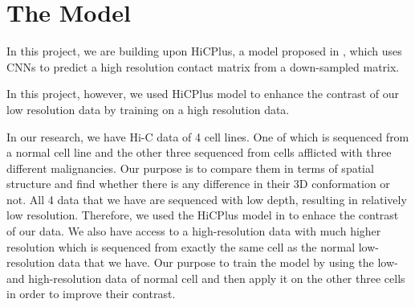 \documentclass{article}
\begin{document}
\section{The Model}
In this project, we are building upon
HiCPlus, a model proposed in 
\cite{zhang2018enhancing}, which
uses CNNs
to predict a high resolution contact
matrix from a down-sampled matrix.

In this project, however,
we used HiCPlus
model to enhance the contrast of our
low resolution data by training on
a high resolution data.

In our research, we have Hi-C data of
4 cell lines. One of which is sequenced
from a normal cell line and the other
three sequenced from cells afflicted
with three different malignancies.
Our purpose is to
compare them in terms of spatial
structure and find whether there is 
any difference in their 3D conformation
or not.
All 4 data that we have are sequenced
with low depth, resulting in relatively
low resolution. Therefore, we used the
HiCPlus model in \cite{zhang2018enhancing}
to enhace the contrast of our data.
We also have access to a high-resolution
data with much higher resolution which
is sequenced from exactly the same cell
as the normal low-resolution data that
we have. Our purpose to train the model
by using the low- and high-resolution data
of normal cell and then apply it on the 
other three cells in order to improve
their contrast.
\end{document}
